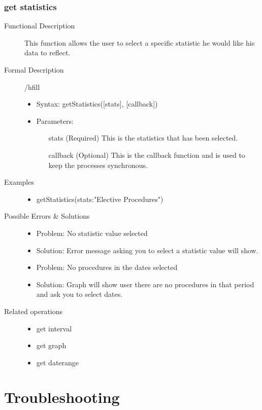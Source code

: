 \documentclass[14pt, a4paper]{article}
\begin{document}
\subsubsection{get statistics}
\begin{description}
\item[Functional Description] This function allows the user to select a specific statistic he would like his data to reflect.
\item[Formal Description]/hfill
\begin{itemize}
	\item Syntax: getStatistics([stats], [callback])\\
	\item Parameters:
		\begin{itemize}
			\item [stats](Required) This is the statistics that has been selected.
			\item [callback](Optional) This is the callback function and is used to keep the processes synchronous.
		\end{itemize}
\end{itemize}
\item[Examples]\hfill
\begin{itemize}
	\item getStatistics({stats:"Elective Procedures"})
\end{itemize}
\item[Possible Errors \& Solutions]
\begin{itemize}
	\item Problem: No statistic value selected
	\item Solution: Error message asking you to select a statistic value will show.
	\item Problem: No procedures in the dates selected
	\item Solution: Graph will show user there are no procedures in that period and ask you to select dates.
\end{itemize}
\item[Related operations] \hfill
\begin{itemize}
	\item get interval
	\item get graph
	\item get daterange
\end{itemize}
\end{description}
\newpage

\section{Troubleshooting}
\end{document}
